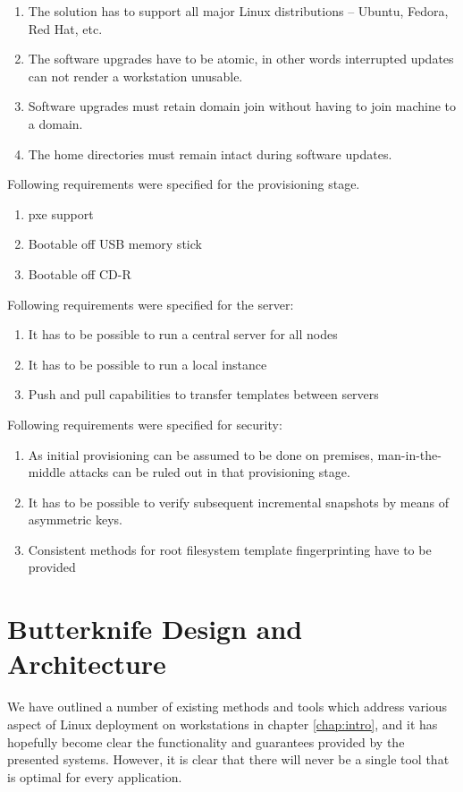 \documentclass[a4paper,11pt]{kth-mag}
\begin{document}
\begin{enumerate}
\item The solution has to support all major Linux distributions -- Ubuntu, Fedora, Red Hat, etc.
\item The software upgrades have to be atomic, in other words interrupted updates can not render a workstation unusable.
\item Software upgrades must retain domain join without having to join machine to a domain.
\item The home directories must remain intact during software updates.
\end{enumerate}

\noindent Following requirements were specified for the provisioning stage.

\begin{enumerate}
\item \acrfull{pxe} support
\item Bootable off USB memory stick
\item Bootable off CD-R
\end{enumerate}

\noindent Following requirements were specified for the server:

\begin{enumerate}
\item It has to be possible to run a central server for all nodes
\item It has to be possible to run a local instance
\item Push and pull capabilities to transfer templates between servers
\end{enumerate}

\noindent Following requirements were specified for security:

\begin{enumerate}
\item As initial provisioning can be assumed to be done on premises,
man-in-the-middle attacks can be ruled out in that
provisioning stage.
\item It has to be possible to verify subsequent incremental snapshots by means of asymmetric keys.
\item Consistent methods for root filesystem template fingerprinting have to be provided
\end{enumerate}


%
%
%
%
\chapter{Butterknife Design and Architecture}
\label{chap:design}
We have outlined a number of existing methods and tools
which address various aspect of Linux deployment on workstations
in chapter \ref{chap:intro}, and it has hopefully become clear
the functionality and guarantees provided by the presented systems.
However, it is clear that there will never be a single tool
that is optimal for every application.
\end{document}

